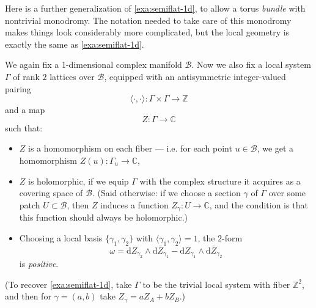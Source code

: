 \documentclass[12pt,letterpaper,reqno]{article}
\numberwithin{equation}{section}
\newcommand{\cB}{\ensuremath{\mathcal B}}
\newcommand{\C}{\ensuremath{\mathbb C}}
\newcommand{\Z}{\ensuremath{\mathbb Z}}
\newcommand{\de}{\mathrm{d}}
\newcommand{\IP}[1]{\langle#1\rangle}
\newcommand{\ti}[1]{\textit{#1}}
\begin{document}
\begin{example} \label{exa:semiflat-1d-general}
Here is a further generalization of \autoref{exa:semiflat-1d},
to allow a torus \ti{bundle} with nontrivial monodromy.
The notation needed to take care of this monodromy 
makes things look considerably more complicated,
but the local geometry is exactly
the same as \autoref{exa:semiflat-1d}.

We again fix a 1-dimensional complex manifold $\cB$.
Now we also fix a local system $\Gamma$ of rank $2$ lattices
over $\cB$, equipped with an antisymmetric integer-valued pairing
\begin{equation}
 \IP{\cdot, \cdot}: \Gamma \times \Gamma \to \Z
\end{equation}
and a map 
\begin{equation}
  Z: \Gamma \to \C
\end{equation}
such that:
\begin{itemize}
\item $Z$ is a homomorphism on each fiber --- i.e. for each 
point $u \in \cB$, we get a homomorphism $Z(u): \Gamma_u \to \C$,
\item $Z$ is holomorphic, if we equip $\Gamma$ with the complex
structure it acquires as a covering space of $\cB$. (Said otherwise: if 
we choose a section $\gamma$ of $\Gamma$ over some 
patch $U \subset \cB$, then $Z$ induces a function $Z_\gamma: U \to \C$,
and the condition is that this function should always be holomorphic.)
\item Choosing a local basis
$\{\gamma_1,\gamma_2\}$ with $\IP{\gamma_1,\gamma_2} = 1$,
the $2$-form
\begin{equation}
\omega = \de Z_{\gamma_2} \wedge \de \bar{Z}_{\gamma_1} - \de Z_{\gamma_1} \wedge \de \bar{Z}_{\gamma_2}
\end{equation}
is \ti{positive}.
\end{itemize}
(To recover \autoref{exa:semiflat-1d}, take $\Gamma$ to be the
trivial local system with fiber $\Z^2$, and then for 
$\gamma = (a,b)$ take $Z_\gamma = a Z_A + b Z_B$.)


\end{example}
\end{document}
